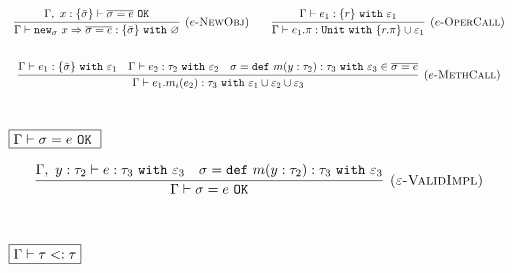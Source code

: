 \documentclass{llncs}
\newcommand{\keywadj}[1]{\mathtt{#1}}
\newcommand{\keyw}[1]{\keywadj{#1}~}
\newcommand{\kwa}[1]{\keywadj{ #1 }}
\begin{document}
\noindent
\fbox{$\Gamma \vdash e : \tau~\keyw{with} \varepsilon$}

\[
\begin{array}{c}

\infer[\textsc{($e$-NewObj)}]
	{\Gamma \vdash \kwa{new}_\sigma~x \Rightarrow \overline{\sigma = e} : \{ \bar \sigma \}~\keyw{with} \varnothing}
	{\Gamma,~x : \{ \bar \sigma \} \vdash \overline{\sigma = e}~\keywadj{OK}} ~~~~~~

\infer[\textsc{($e$-OperCall)}]
	{\Gamma \vdash e_1.\pi : \keyw{Unit} \keyw{with} \{ r.\pi \} \cup \varepsilon_1}
	{\Gamma \vdash e_1 : \{ r \}~ \keyw{with} \varepsilon_1} \\[5ex]
	
\infer[\textsc{($e$-MethCall)}]
	{\Gamma \vdash e_{1}.m_i(e_{2}):\tau_{3}~\keyw{with} \varepsilon_1 \cup \varepsilon_2 \cup \varepsilon_3}
	{\Gamma \vdash e_{1} : \{ \bar \sigma \}~\keyw{with} \varepsilon_1 & \Gamma \vdash e_{2} : \tau_{2}~\keyw{with} \varepsilon_2 & \sigma = \keyw{def} m(y:\tau_{2}):\tau_{3}~\keyw{with} \varepsilon_3 \in \overline{\sigma = e}} \\[5ex]
\end{array}
\]

\noindent
$\fbox{$\Gamma \vdash \sigma = e~\keyw{OK}$}$

\[
\begin{array}{c}
\infer[\textsc{($\varepsilon$-ValidImpl)}]
	{\Gamma \vdash \sigma = e~\keywadj{OK}}
	{\Gamma,~y:\tau_{2} \vdash e: \tau_{3}~\keyw{with} \varepsilon_3 & \sigma = \keyw{def} m(y:\tau_{2}):\tau_{3}~\keyw{with} \varepsilon_3} \\[5ex]
\end{array}
\]



\noindent
$\fbox{$\Gamma \vdash \tau <: \tau$}$
\end{document}
